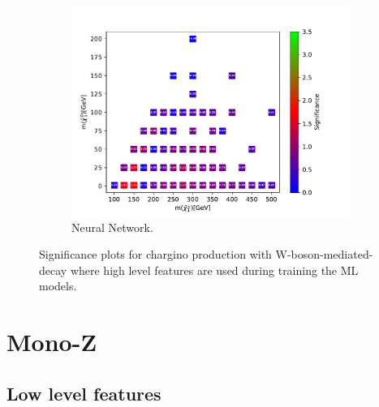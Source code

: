 \begin{figure}[H]
    \begin{subfigure}[t!]{0.49\textwidth}
    \includegraphics[width = \textwidth]{Figures/Significances/significance_NN_WW_High_level.pdf}
    \caption{Neural Network.}
        \label{fig:signHighWWNN}
    \end{subfigure}
    \caption{Significance plots for chargino production with W-boson-mediated-decay where high level features are used during training the ML models.}
    \label{fig:signHighWW}
\end{figure}








\section{Mono-Z}


\subsection{Low level features}

